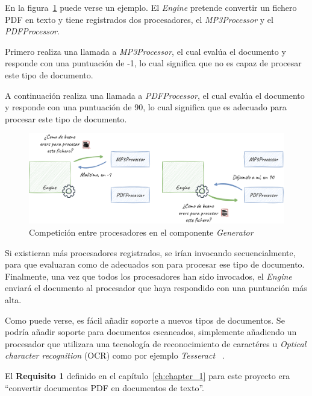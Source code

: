 En la figura~\ref{fig:chapter_4.generator_component_processors} puede verse un ejemplo.
El \textit{Engine} pretende convertir un fichero PDF en texto y tiene registrados dos procesadores, el
\textit{MP3Processor} y el \textit{PDFProcessor}.

Primero realiza una llamada a \textit{MP3Processor}, el cual evalúa el documento y responde con una puntuación
de -1, lo cual significa que no es capaz de procesar este tipo de documento.

A continuación realiza una llamada a \textit{PDFProcessor}, el cual evalúa el documento y responde con una puntuación
de 90, lo cual significa que es adecuado para procesar este tipo de documento.

\begin{figure}[ht]
    \begin{center}
        \includegraphics[width=\textwidth]{./chapter/4/images/chapter_4.generator_component_processors}
        \caption{Competición entre procesadores en el componente \textit{Generator}}
        \label{fig:chapter_4.generator_component_processors}
    \end{center}
\end{figure}

Si existieran más procesadores registrados, se irían invocando secuencialmente, para que evaluaran como de adecuados
son para procesar ese tipo de documento.
Finalmente, una vez que todos los procesadores han sido invocados, el \textit{Engine} enviará el documento al procesador
que haya respondido con una puntuación más alta.

Como puede verse, es fácil añadir soporte a nuevos tipos de documentos.
Se podría añadir soporte para documentos escaneados, simplemente añadiendo un procesador que utilizara una tecnología
de reconocimiento de caractéres u \textit{Optical character recognition} (OCR) como por ejemplo \textit{Tesseract}
~\cite{https://github.com/tesseract-ocr/tesseract}.

El \textbf{Requisito 1} definido en el capítulo~\ref{ch:chapter_1} para este proyecto era ``convertir documentos PDF
en documentos de texto''.

